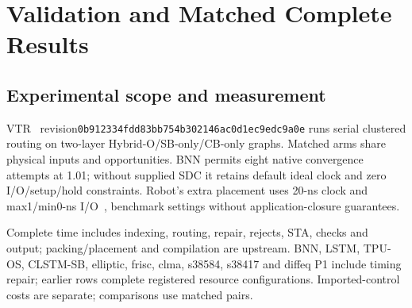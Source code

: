 \documentclass[conference,10pt]{IEEEtran}
\begin{document}
\section{Validation and Matched Complete Results}
\subsection{Experimental scope and measurement}
VTR~\cite{vtr9paper} revision\newline\texttt{0b912334fdd83bb754b302146ac0d1ec9edc9a0e} runs serial clustered routing on two-layer Hybrid-O/SB-only/CB-only graphs. Matched arms share physical inputs and opportunities. BNN permits eight native convergence attempts at 1.01; without supplied SDC it retains default ideal clock and zero I/O/setup/hold constraints. Robot's extra placement uses 20-ns clock and max1/min0-ns I/O~\cite{vprsdc}, benchmark settings without application-closure guarantees.

Complete time includes indexing, routing, repair, rejects, STA, checks and output; packing/placement and compilation are upstream. BNN, LSTM, TPU-OS, CLSTM-SB, elliptic, frisc, clma, s38584, s38417 and diffeq P1 include timing repair; earlier rows complete registered resource configurations. Imported-control costs are separate; comparisons use matched pairs.
\end{document}
